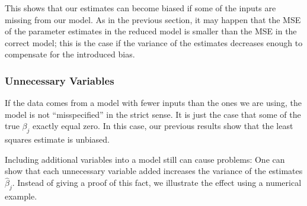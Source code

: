 \documentclass[
  a4paper,
]{article}
\theoremstyle{definition}
\theoremstyle{definition}
\theoremstyle{definition}
\theoremstyle{definition}
\theoremstyle{remark}
\begin{document}
This shows that our estimates can become biased if some of the inputs
are missing from our model. As in the previous section, it may happen
that the MSE of the parameter estimates in the reduced model
is smaller than the MSE in the correct model; this is the case if the
variance of the estimates decreases enough to compensate for the
introduced bias.

\hypertarget{unnecessary-variables}{%
\subsubsection{Unnecessary Variables}\label{unnecessary-variables}}

If the data comes from a model with fewer inputs than the ones we are using,
the model is not ``misspecified'' in the strict sense. It is just the case that
some of the true \(\beta_j\) exactly equal zero. In this case, our previous
results show that the least squares estimate is unbiased.

Including additional variables into a model still can cause problems:
One can show that each unnecessary variable added increases the variance of the
estimates \(\hat\beta_j\). Instead of giving a proof of this fact,
we illustrate the effect using a numerical example.
\end{document}
